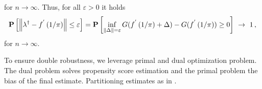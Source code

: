  for $ n \to \infty $.
 Thus, for all $ \varepsilon > 0 $
 it holds
 \begin{gather*}
   \P
   \left[ 
     \norm
     {
      \lambda ^ \dagger
      -
      f ^ { ' }
      \left( 
        1 / \pi 
      \right)
     }
     \le
     \varepsilon
   \right]
   =
   \P
   \left[ 
     \inf _ { \norm{\Delta} = \varepsilon }
     G
     (
      f ^ { ' }
      \left( 
        1 / \pi 
      \right)
      +
      \Delta
     )
     -
     G
     (
      f ^ { ' }
      \left( 
        1 / \pi 
      \right)
     )
     \ge 
     0
   \right]
   \ 
   \to 
   \ 
   1
   \,,
 \end{gather*}
 for $ n \to \infty $.
\begin{takeaways}
  To ensure double robustness, we leverage primal and dual optimization
  problem. The dual problem solves propensity score estimation and the 
  primal problem the bias of the final estimate.
  Partitioning estimates as in \cite{Gyorfi2002}. 
\end{takeaways}

